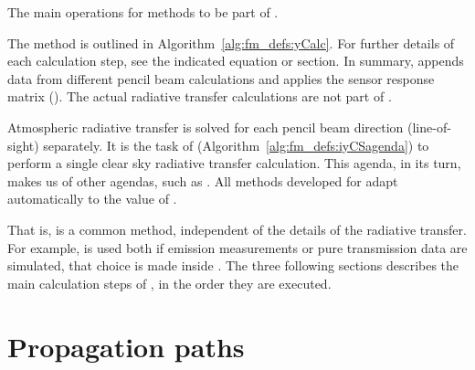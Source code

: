 \begin{algorithm}[t]
 \begin{algorithmic}
 \end{algorithmic}
 \caption{The main operations for methods to be part of
   .}
 \label{alg:fm_defs:iyCSagenda}
\end{algorithm}
The  method is outlined in Algorithm~\ref{alg:fm_defs:yCalc}.
For further details of each calculation step, see the indicated equation or
section. In summary,  appends data from different pencil beam
calculations and applies the sensor response matrix (). The actual
radiative transfer calculations are not part of .

Atmospheric radiative transfer is solved for each pencil beam direction
(line-of-sight) separately. It is the task of 
(Algorithm~\ref{alg:fm_defs:iyCSagenda}) to perform a single clear sky
radiative transfer calculation. This agenda, in its turn, makes us of other
agendas, such as . All methods developed for
 adapt automatically to the value of
.

That is,  is a common method, independent of the details of
the radiative transfer. For example,  is used both if emission
measurements or pure transmission data are simulated, that choice is made
inside . 
The three following sections describes the main calculation steps of 
, in the order they are executed.


\section{Propagation paths}
\label{sec:fm_defs:ppaths}

